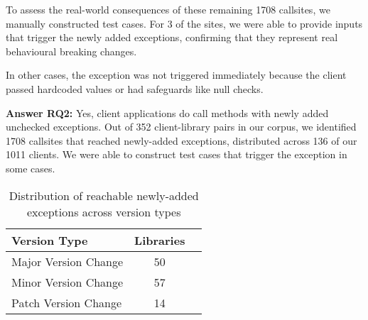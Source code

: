 To assess the real-world consequences of these remaining 1708 callsites, we manually constructed test cases. For 3 of the sites, we were able to provide inputs that trigger the newly added exceptions, confirming that they represent real behavioural breaking changes.

In other cases, the exception was not triggered immediately because the client passed hardcoded values or had safeguards like null checks.

\vspace{1em}
\begin{tcolorbox}[colback=gray!10, colframe=black]
\textbf{Answer RQ2:} Yes, client applications do call methods with newly added unchecked exceptions. Out of 352 client-library pairs in our corpus, we identified 1708 callsites that reached newly-added exceptions, distributed across 136 of our 1011 clients. We were able to construct test cases that trigger the exception in some cases.
\end{tcolorbox}
\vspace{1em}

\begin{table}[h]
\centering
\caption{Distribution of reachable newly-added exceptions across version types}
\label{tab:version-distribution}
\begin{tabular}{lcc}
\toprule
\textbf{Version Type} & \textbf{Libraries} \\
\midrule
Major Version Change & 50 \\
Minor Version Change & 57 \\
Patch Version Change & 14 \\
\bottomrule
\end{tabular}
\end{table}

